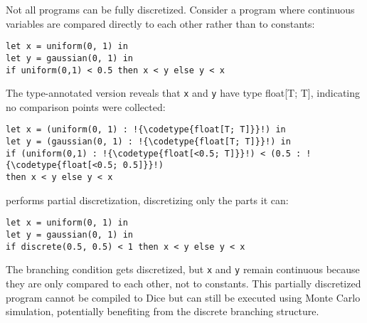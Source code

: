 \documentclass[acmsmall,screen,dvipsnames,x11names,nonacm,anonymous,review]{acmart}
\newcommand{\codetype}[1]{\textcolor{typecolor}{\ttfamily\small#1}}
\newcommand{\Slice}{\text{\scshape Slice}\xspace}
\begin{document}
Not all programs can be fully discretized. Consider a program where continuous variables are compared directly to each other rather than to constants:

\begin{lstlisting}[aboveskip=1em,belowskip=1em,escapechar=!]
let x = uniform(0, 1) in
let y = gaussian(0, 1) in
if uniform(0,1) < 0.5 then x < y else y < x
\end{lstlisting}

\noindent The type-annotated version reveals that \texttt{x} and \texttt{y} have type \codetype{float[T; T]}, indicating no comparison points were collected:

\begin{lstlisting}[aboveskip=1em,belowskip=1em,escapechar=!]
let x = (uniform(0, 1) : !{\codetype{float[T; T]}}!) in
let y = (gaussian(0, 1) : !{\codetype{float[T; T]}}!) in
if (uniform(0,1) : !{\codetype{float[<0.5; T]}}!) < (0.5 : !{\codetype{float[<0.5; 0.5]}}!) 
then x < y else y < x
\end{lstlisting}

\noindent \Slice performs partial discretization, discretizing only the parts it can:

\begin{lstlisting}[aboveskip=1em,belowskip=1em]
let x = uniform(0, 1) in
let y = gaussian(0, 1) in
if discrete(0.5, 0.5) < 1 then x < y else y < x
\end{lstlisting}

\noindent The branching condition gets discretized, but \texttt{x} and \texttt{y} remain continuous because they are only compared to each other, not to constants. This partially discretized program cannot be compiled to Dice but can still be executed using Monte Carlo simulation, potentially benefiting from the discrete branching structure.



\end{document}
